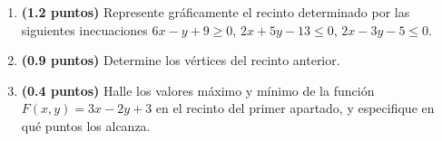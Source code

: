 
\begin{enumerate}[label=\alph*)]
\item \textbf{(1.2 puntos)} Represente gráficamente el recinto determinado por las siguientes inecuaciones $6x-y+9\geq0$, $2x+5y-13\leq0$, $2x-3y-5\leq0$.
\item \textbf{(0.9 puntos)} Determine los vértices del recinto anterior.
\item \textbf{(0.4 puntos)} Halle los valores máximo y mínimo de la función $F(x,y)=3x-2y+3$ en el recinto del primer apartado, y especifique en qué puntos los alcanza.
\end{enumerate}
